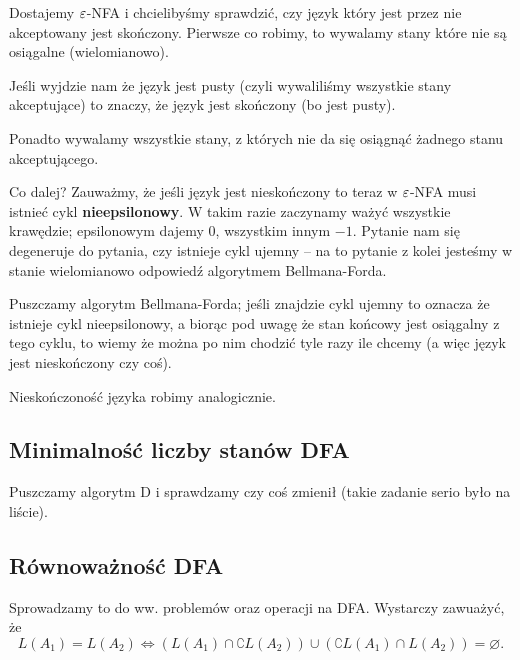Dostajemy \(\varepsilon\)-NFA i chcielibyśmy sprawdzić, czy język który jest przez nie akceptowany jest skończony. Pierwsze co robimy, to wywalamy stany które nie są osiągalne (wielomianowo).

Jeśli wyjdzie nam że język jest pusty (czyli wywaliliśmy wszystkie stany akceptujące) to znaczy, że język jest skończony (bo jest pusty).

Ponadto wywalamy wszystkie stany, z których nie da się osiągnąć żadnego stanu akceptującego.

Co dalej? Zauważmy, że jeśli język jest nieskończony to teraz w \(\varepsilon\)-NFA musi istnieć cykl \textbf{nieepsilonowy}. W takim razie zaczynamy ważyć wszystkie krawędzie; epsilonowym dajemy \(0\), wszystkim innym \(-1\). Pytanie nam się degeneruje do pytania, czy istnieje cykl ujemny -- na to pytanie z kolei jesteśmy w stanie wielomianowo odpowiedź algorytmem Bellmana-Forda.

Puszczamy algorytm Bellmana-Forda; jeśli znajdzie cykl ujemny to oznacza że istnieje cykl nieepsilonowy, a biorąc pod uwagę że stan końcowy jest osiągalny z tego cyklu, to wiemy że można po nim chodzić tyle razy ile chcemy (a więc język jest nieskończony czy coś).

Nieskończoność języka robimy analogicznie.

\subsection{Minimalność liczby stanów DFA}

Puszczamy algorytm D i sprawdzamy czy coś zmienił (takie zadanie serio było na liście).

\subsection{Równoważność DFA}

Sprowadzamy to do ww. problemów oraz operacji na DFA. Wystarczy zawuażyć, że
\[
	L(A_1) = L(A_2) \iff (L(A_1) \cap \complement{L(A_2)}) \cup (\complement{L(A_1)} \cap L(A_2)) = \varnothing .
\]
